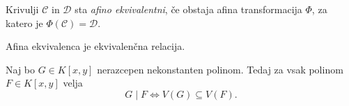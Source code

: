 \begin{definicija}
Krivulji $\mathcal{C}$ in $\mathcal{D}$ sta
\emph{afino ekvivalentni},
če obstaja afina transformacija $\Phi$, za katero je
$\Phi(\mathcal{C}) = \mathcal{D}$.
\end{definicija}

\begin{opomba}
Afina ekvivalenca je ekvivalenčna relacija.
\end{opomba}

\begin{lema}[Study]
Naj bo $G \in K[x,y]$ nerazcepen nekonstanten polinom. Tedaj za
vsak polinom $F \in K[x,y]$ velja
\[
G \mid F \iff V(G) \subseteq V(F).
\]
\end{lema}
